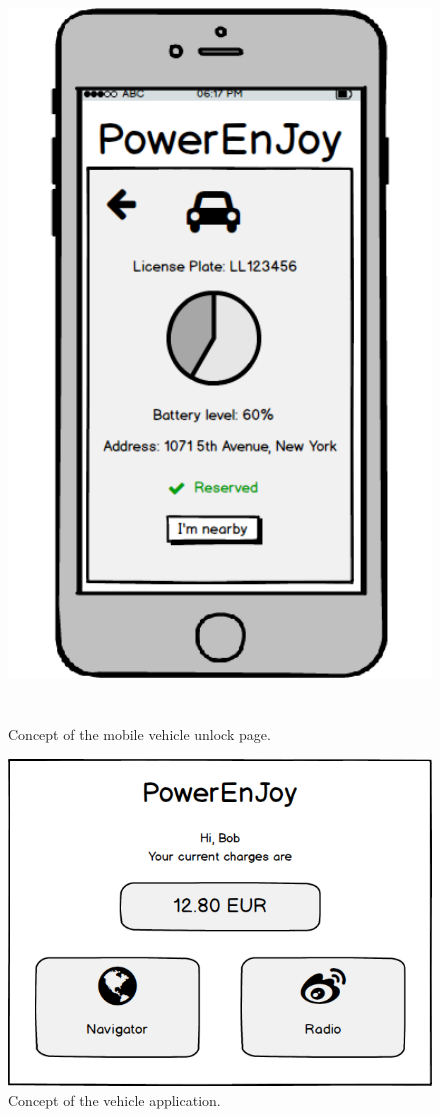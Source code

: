 \begin{figure}[H]
	\centering
	\includegraphics[height=20cm]{mockup/MobileUnlock.png}
	\caption{Concept of the mobile vehicle unlock page.}
\end{figure}

\begin{figure}[H]
	\centering
	\includegraphics[width=\textwidth]{mockup/VehicleApplication.png}
	\caption{Concept of the vehicle application.}
\end{figure}

